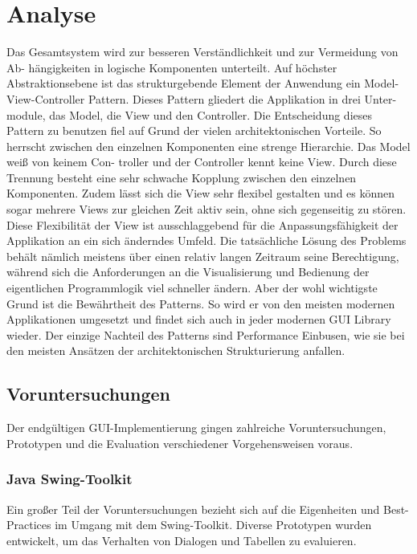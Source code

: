 \chapter{Analyse}
Das Gesamtsystem wird zur besseren Verständlichkeit und zur Vermeidung von Ab-
hängigkeiten in logische Komponenten unterteilt.
Auf höchster Abstraktionsebene ist das strukturgebende Element der Anwendung ein
Model-View-Controller Pattern. Dieses Pattern gliedert die Applikation in drei Unter-
module, das Model, die View und den Controller. Die Entscheidung dieses Pattern zu
benutzen fiel auf Grund der vielen architektonischen Vorteile. So herrscht zwischen
den einzelnen Komponenten eine strenge Hierarchie. Das Model weiß von keinem Con-
troller und der Controller kennt keine View. Durch diese Trennung besteht eine sehr
schwache Kopplung zwischen den einzelnen Komponenten. Zudem lässt sich die View
sehr flexibel gestalten und es können sogar mehrere Views zur gleichen Zeit aktiv sein,
ohne sich gegenseitig zu stören. Diese Flexibilität der View ist ausschlaggebend für die
Anpassungsfähigkeit der Applikation an ein sich änderndes Umfeld. Die tatsächliche
Lösung des Problems behält nämlich meistens über einen relativ langen Zeitraum seine
Berechtigung, während sich die Anforderungen an die Visualisierung und Bedienung
der eigentlichen Programmlogik viel schneller ändern. Aber der wohl wichtigste Grund
ist die Bewährtheit des Patterns. So wird er von den meisten modernen Applikationen
umgesetzt und findet sich auch in jeder modernen GUI Library wieder. Der einzige
Nachteil des Patterns sind Performance Einbusen, wie sie bei den meisten Ansätzen der
architektonischen Strukturierung anfallen.


\section{Voruntersuchungen}

    Der endgültigen GUI-Implementierung gingen zahlreiche Voruntersuchungen,
    Prototypen und die Evaluation verschiedener Vorgehensweisen voraus.

    \subsection{Java Swing-Toolkit}
    
        Ein großer Teil der Voruntersuchungen bezieht sich auf die Eigenheiten
        und Best-Practices im Umgang mit dem Swing-Toolkit. Diverse Prototypen
        wurden entwickelt, um das Verhalten von Dialogen und Tabellen zu
        evaluieren.
        
